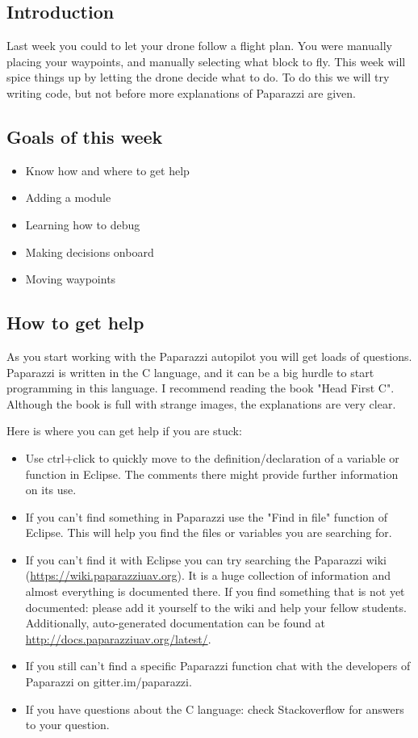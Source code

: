 \documentclass{article}
\begin{document}

\subsection*{Introduction}
Last week you could to let your drone follow a flight plan. You were manually placing your waypoints, and manually selecting what block to fly. This week will spice things up by letting the drone decide what to do. 
To do this we will try writing code, but not before more explanations of Paparazzi are given. 
\subsection*{Goals of this week}
\begin{itemize}
\item Know how and where to get help
\item Adding a module
\item Learning how to debug
\item Making decisions onboard
\item Moving waypoints
\end{itemize}
\subsection*{How to get help}
As you start working with the Paparazzi autopilot you will get loads of questions. Paparazzi is written in the C language, and it can be a big hurdle to start programming in this language. I recommend reading the book "Head First C". Although the book is full with strange images, the explanations are very clear. 

Here is where you can get help if you are stuck: 
\begin{itemize}
\item Use ctrl+click to quickly move to the definition/declaration of a variable or function in Eclipse. The comments there might provide further information on its use.
\item If you can't find something in Paparazzi use the "Find in file" function of Eclipse. This will help you find the files or variables you are searching for.
\item If you can't find it with Eclipse you can try searching the Paparazzi wiki (\url{https://wiki.paparazziuav.org}). It is a huge collection of information and almost everything is documented there. If you find something that is not yet documented: please add it yourself to the wiki and help your fellow students. Additionally, auto-generated documentation can be found at \url{http://docs.paparazziuav.org/latest/}.
\item If you still can't find a specific Paparazzi function chat with the developers of Paparazzi on gitter.im/paparazzi.
\item If you have questions about the C language: check Stackoverflow for answers to your question.
\end{itemize}
\end{document}
